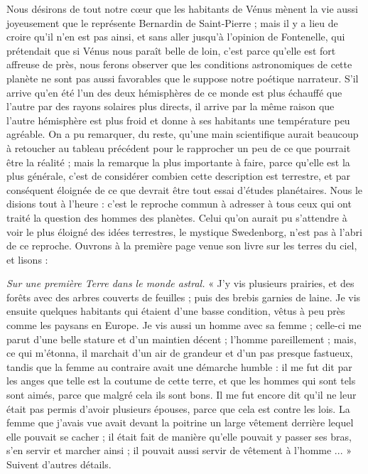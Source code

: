 \documentclass[a4paper, 11pt, oneside, landscape]{article}
\begin{document}
Nous désirons de tout notre cœur que les habitants de Vénus mènent la vie aussi joyeusement que le représente Bernardin de Saint-Pierre ; mais il y a lieu de croire qu'il n'en est pas ainsi, et sans aller jusqu'à l'opinion de Fontenelle, qui prétendait que si Vénus nous paraît belle de loin, c'est parce qu'elle est fort affreuse de près, nous ferons observer que les conditions astronomiques de cette planète ne sont pas aussi favorables que le suppose notre poétique narrateur. S'il arrive qu'en été l'un des deux hémisphères de ce monde est plus échauffé que l'autre par des rayons solaires plus directs, il arrive par la même raison que l'autre hémisphère est plus froid et donne à ses habitants une température peu agréable. On a pu remarquer, du reste, qu'une main scientifique aurait beaucoup à retoucher au tableau précédent pour le rapprocher un peu de ce que pourrait être la réalité ; mais la remarque la plus importante à faire, parce qu'elle est la plus générale, c'est de considérer combien cette description est terrestre, et par conséquent éloignée de ce que devrait être tout essai d'études planétaires. Nous le disions tout à l'heure : c'est le reproche commun à adresser à tous ceux qui ont traité la question des hommes des planètes. Celui qu'on aurait pu s'attendre à voir le plus éloigné des idées terrestres, le mystique Swedenborg, n'est pas à l'abri de ce reproche. Ouvrons à la première page venue son livre sur les terres du ciel, et lisons :

\emph{Sur une première Terre dans le monde astral.} « J'y vis plusieurs prairies, et des forêts avec des arbres couverts de feuilles ; puis des brebis garnies de laine. Je vis ensuite quelques habitants qui étaient d'une basse condition, vêtus à peu près comme les paysans en Europe. Je vis aussi un homme avec sa femme ; celle-ci me parut d'une belle stature et d'un maintien décent ; l'homme pareillement ; mais, ce qui m'étonna, il marchait d'un air de grandeur et d'un pas presque fastueux, tandis que la femme au contraire avait une démarche humble : il me fut dit par les anges que telle est la coutume de cette terre, et que les hommes qui sont tels sont aimés, parce que malgré cela ils sont bons. Il me fut encore dit qu'il ne leur était pas permis d'avoir plusieurs épouses, parce que cela est contre les lois. La femme que j'avais vue avait devant la poitrine un large vêtement derrière lequel elle pouvait se cacher ; il était fait de manière qu'elle pouvait y passer ses bras, s'en servir et marcher ainsi ; il pouvait aussi servir de vêtement à l'homme ... » Suivent d'autres détails.
\end{document}
